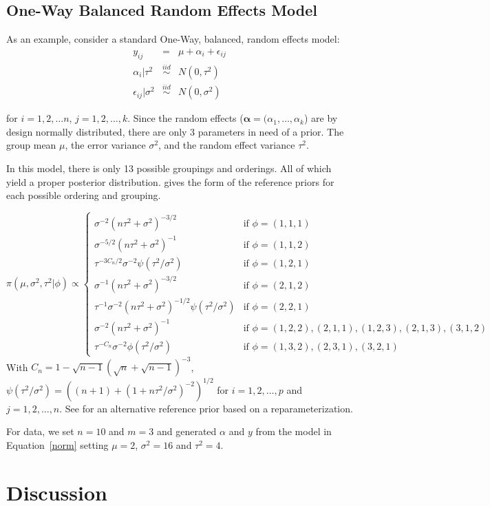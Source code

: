 \documentclass[11pt,a4paper,notitlepage]{article}
\begin{document}
\subsection{One-Way Balanced Random Effects Model}

As an example, consider a standard One-Way, balanced, random effects model:
\begin{eqnarray*}
y_{ij} &=& \mu + \alpha_{i} + \epsilon_{ij}\label{norm}\\
\alpha_{i}|\tau^2&\stackrel{iid}{\sim}& N(0,\tau^2)\\
\epsilon_{ij}|\sigma^2&\stackrel{iid}{\sim}& N(0,\sigma^2)
\end{eqnarray*}

for $i = 1, 2, \ldots n$, $j=1, 2, \ldots, k$. Since the random effects
($\boldsymbol{\alpha}=(\alpha_1, \ldots, \alpha_k$) are by design
normally distributed, there are only 3 parameters in need of a prior.
The group mean $\mu$, the error variance $\sigma^2$, and the random
effect variance $\tau^2$.

In this model, there is only 13 possible groupings and orderings. All
of which yield a proper posterior
distribution. \cite{BergerBernardo1992b} gives the form of the
reference priors for each possible ordering and grouping.

\[
\pi(\mu,\sigma^2,\tau^2|\phi) \propto \begin{cases}
  \sigma^{-2}\left(n\tau^2+\sigma^2\right)^{-3/2} & \text{if }\phi=(1,1,1)\\
  \sigma^{-5/2}\left(n\tau^2+\sigma^2\right)^{-1} & \text{if }\phi=(1,1,2)\\
  \tau^{-3C_n/2}\sigma^{-2}\psi(\tau^2/\sigma^2)& \text{if }\phi=(1,2,1)\\
\sigma^{-1}\left(n\tau^2+\sigma^2\right)^{-3/2} & \text{if }\phi=(2,1,2)\\
  \tau^{-1}\sigma^{-2}\left(n\tau^2+\sigma^2\right)^{-1/2}\psi(\tau^2/\sigma^2) & \text{if }\phi=(2,2,1)\\
  \sigma^{-2}\left(n\tau^2+\sigma^2\right)^{-1} & \text{if }\phi=(1,2,2), (2,1,1), (1,2,3), (2,1,3), (3,1,2)\\
  \tau^{-C_n}\sigma^{-2}\phi(\tau^2/\sigma^2) & \text{if }\phi=(1,3,2),(2,3,1),(3,2,1)
\end{cases}
\]
With $C_n = 1-\sqrt{n-1}\left(\sqrt{n}+\sqrt{n-1}\right)^{-3}$,
$\psi(\tau^2/\sigma^2)=\left((n+1)+\left(1+
    n\tau^2/\sigma^2\right)^{-2}\right)^{1/2}$ for $i=1,2,\ldots, p$
and $j=1,2,\ldots, n$. See \cite{Ye1991} for an alternative reference
prior based on a reparameterization.

For data, we set $n=10$ and $m=3$ and generated $\alpha$ and $y$ from
the model in Equation~\eqref{norm} setting $\mu=2$, $\sigma^2=16$ and
$\tau^2=4$. 


\section{Discussion}


\pagebreak



\end{document}
